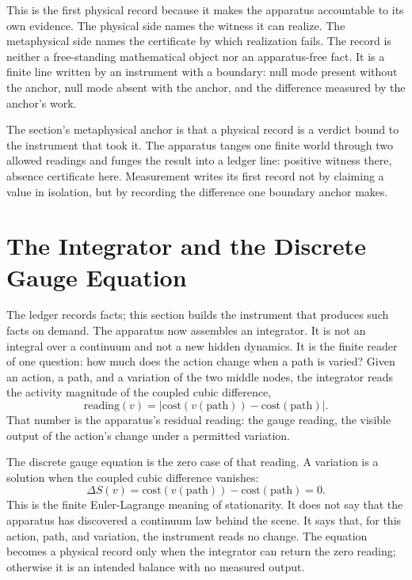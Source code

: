 This is the first physical record because it makes the apparatus accountable to
its own evidence. The physical side names the witness it can realize. The
metaphysical side names the certificate by which realization fails. The record
is neither a free-standing mathematical object nor an apparatus-free fact. It is
a finite line written by an instrument with a boundary: null mode present
without the anchor, null mode absent with the anchor, and the difference
measured by the anchor's work.

The section's metaphysical anchor is that a physical record is a verdict bound
to the instrument that took it. The apparatus tanges one finite world through
two allowed readings and funges the result into a ledger line: positive witness
there, absence certificate here. Measurement writes its first record not by
claiming a value in isolation, but by recording the difference one boundary
anchor makes.

\section{The Integrator and the Discrete Gauge Equation}

The ledger records facts; this section builds the instrument that produces such
facts on demand. The apparatus now assembles an integrator. It is not an integral
over a continuum and not a new hidden dynamics. It is the finite reader of one
question: how much does the action change when a path is varied? Given an action,
a path, and a variation of the two middle nodes, the integrator reads the
activity magnitude of the coupled cubic difference,
\[
  \mathrm{reading}(v)
    =
  \bigl|\mathrm{cost}(v(\mathrm{path}))-\mathrm{cost}(\mathrm{path})\bigr|.
\]
That number is the apparatus's residual reading: the gauge reading, the visible
output of the action's change under a permitted variation.

The discrete gauge equation is the zero case of that reading. A variation is a
solution when the coupled cubic difference vanishes:
\[
  \Delta S(v)
  =
  \mathrm{cost}(v(\mathrm{path}))-\mathrm{cost}(\mathrm{path})
  =
  0.
\]
This is the finite Euler-Lagrange meaning of stationarity. It does not say that
the apparatus has discovered a continuum law behind the scene. It says that,
for this action, path, and variation, the instrument reads no change. The
equation becomes a physical record only when the integrator can return the zero
reading; otherwise it is an intended balance with no measured output.


